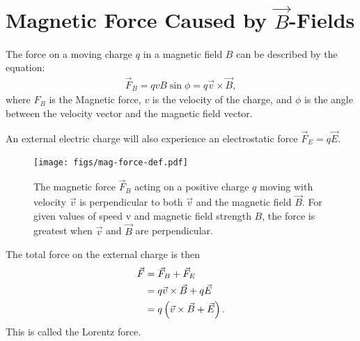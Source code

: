 \documentclass[12pt,b4paper]{article}
\begin{document}
\section{Magnetic Force Caused by $\vec{B}$-Fields}
The force on a moving charge $q$ in a magnetic field $B$ can be described by the equation:
\begin{align}
    \vec{F}_B=qvB\sin\phi=q\Vec{v}\times\Vec{B},\label{eq:mag-field-force}
\end{align}
where $F_B$ is the Magnetic force, $v$ is the velocity of the charge, and $\phi$ is the angle between the velocity vector and the magnetic field vector.

An external electric charge will also experience an electrostatic force $\vec{F}_E=q\vec{E}$.
\begin{figure}[H]
    \centering
    \texttt{[image: figs/mag-force-def.pdf]}
    \caption{The magnetic force $\vec{F}_B$ acting on a positive charge $q$ moving with velocity $\vec{v}$ is perpendicular to both $\vec{v}$ and the magnetic field $\vec{B}$. For given values of speed v and magnetic field strength $B$, the force is greatest when $\vec{v}$ and $\vec{B}$ are perpendicular.}
    \label{fig:mag-force-def}
\end{figure}
The total force on the external charge is then
\begin{align}
    \vec{F}&=\vec{F}_B+\vec{F}_E\notag\\
    &=q\Vec{v}\times\Vec{B}+q\vec{E}\notag\\
    &=q\left(\Vec{v}\times\Vec{B}+\vec{E}\right).
\end{align}
This is called the Lorentz force.
\end{document}
